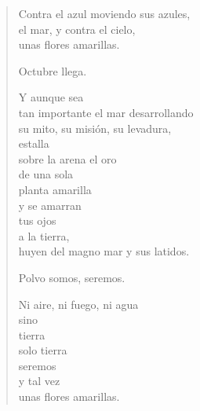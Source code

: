 \documentclass[12pt]{article}
\begin{document}
\clearpage
{}
\begin{verse}

Contra el azul moviendo sus azules,\\
el mar, y contra el cielo,\\
unas flores amarillas.  

Octubre llega.  

Y aunque sea\\
tan importante el mar desarrollando\\
su mito, su misión, su levadura,\\
estalla\\
sobre la arena el oro\\
de una sola\\
planta amarilla\\
y se amarran\\
tus ojos\\
a la tierra,\\
huyen del magno mar y sus latidos.  

Polvo somos, seremos.  

Ni aire, ni fuego, ni agua\\
sino\\
tierra\\
solo tierra\\
seremos\\
y tal vez\\
unas flores amarillas.  

\end{verse}
\end{document}
